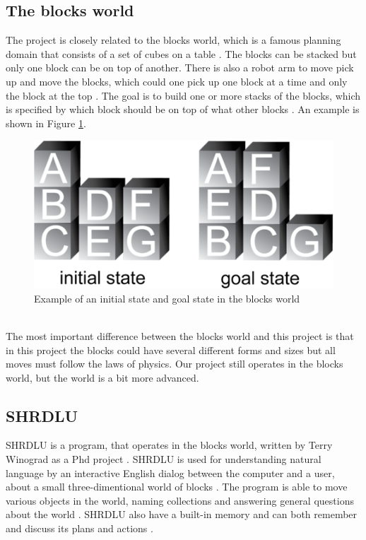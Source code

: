 \subsection{The blocks world}
The project is closely related to the blocks world, which is a famous planning domain that consists of a set of cubes on a table \citep{blocksworld_ai}. The blocks can be stacked but only one block can be on top of another. There is also a robot arm to move pick up and move the blocks, which could one pick up one block at a time and only the block at the top \citep{blocksworld_ai}. The goal is to build one or more stacks of the blocks, which is specified by which block should be on top of what other blocks \citep{blocksworld_ai}. An example is shown in Figure \ref{fig:blocksworld}.
\begin{figure}[h!]
\centering
\includegraphics[scale = 0.4]{fig/blocksworld.png}
\caption{Example of an initial state and goal state in the blocks world \citep{blocksworld_fig}}
\label{fig:blocksworld}
\end{figure}\\
The most important difference between the blocks world and this project is that in this project the blocks could have several different forms and sizes but all moves must follow the laws of physics. Our project still operates in the blocks world, but the world is a bit more advanced. 

\subsection{SHRDLU}
SHRDLU is a program, that operates in the blocks world, written by Terry Winograd as a Phd project \citep{SHRDLU_url}. SHRDLU is used for understanding natural language by an interactive English dialog between the computer and a user, about a small three-dimentional world of blocks \citep{SHRDLU_url}. The program is able to move various objects in the world, naming collections and answering general questions about the world \citep{SHRDLU_url2}. SHRDLU also have a built-in memory and can both remember and discuss its plans and actions \citep{SHRDLU_url2}.

